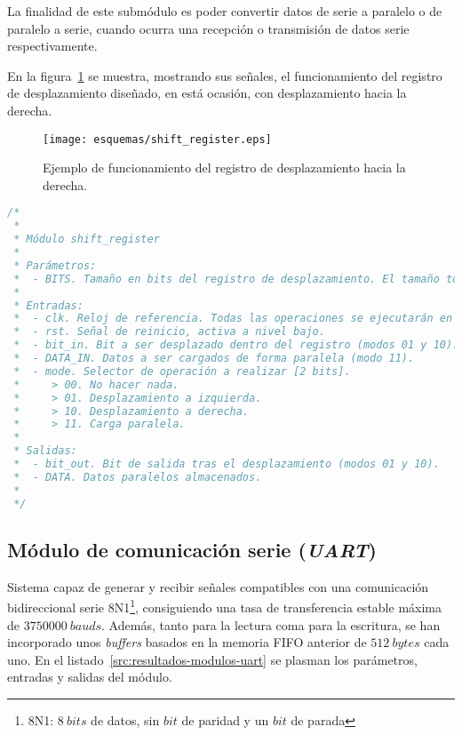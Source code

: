 La finalidad de este submódulo es poder convertir datos de serie a paralelo o de paralelo a serie, cuando ocurra una recepción o transmisión de datos serie respectivamente.

En la figura~\ref{fig:shift_esquema} se muestra, mostrando sus señales, el funcionamiento del registro de desplazamiento diseñado, en está ocasión, con desplazamiento hacia la derecha.

\begin{figure}[htb]
    \centering
    \texttt{[image: esquemas/shift\_register.eps]}
    \caption{Ejemplo de funcionamiento del registro de desplazamiento hacia la derecha.}
    \label{fig:shift_esquema}
\end{figure}

\begin{lstlisting}[language=Verilog,
    caption={Parámetros, entradas y salidas del módulo shift\_register.},
    label=src:resultados-modulos-shift]
/*
 *
 * Módulo shift_register
 *
 * Parámetros:
 *  - BITS. Tamaño en bits del registro de desplazamiento. El tamaño total será de BITS + 1 (bit de salida).
 *
 * Entradas:
 *  - clk. Reloj de referencia. Todas las operaciones se ejecutarán en el flanqueo de subida.
 *  - rst. Señal de reinicio, activa a nivel bajo.
 *  - bit_in. Bit a ser desplazado dentro del registro (modos 01 y 10).
 *  - DATA_IN. Datos a ser cargados de forma paralela (modo 11).
 *  - mode. Selector de operación a realizar [2 bits].
 *     > 00. No hacer nada.
 *     > 01. Desplazamiento a izquierda.
 *     > 10. Desplazamiento a derecha.
 *     > 11. Carga paralela.
 *
 * Salidas:
 *  - bit_out. Bit de salida tras el desplazamiento (modos 01 y 10).
 *  - DATA. Datos paralelos almacenados.
 *
 */
\end{lstlisting}


\subsection{Módulo de comunicación serie (\emph{UART})}
Sistema capaz de generar y recibir señales compatibles con una comunicación bidireccional serie 8N1\footnote{8N1: $8~bits$ de datos, sin $bit$ de paridad y un $bit$ de parada}, consiguiendo una tasa de transferencia estable máxima de $3750000~bauds$. Además, tanto para la lectura coma para la escritura, se han incorporado unos \emph{buffers} basados en la memoria FIFO anterior de $512~bytes$ cada uno. En el listado~\ref{src:resultados-modulos-uart} se plasman los parámetros, entradas y salidas del módulo.

